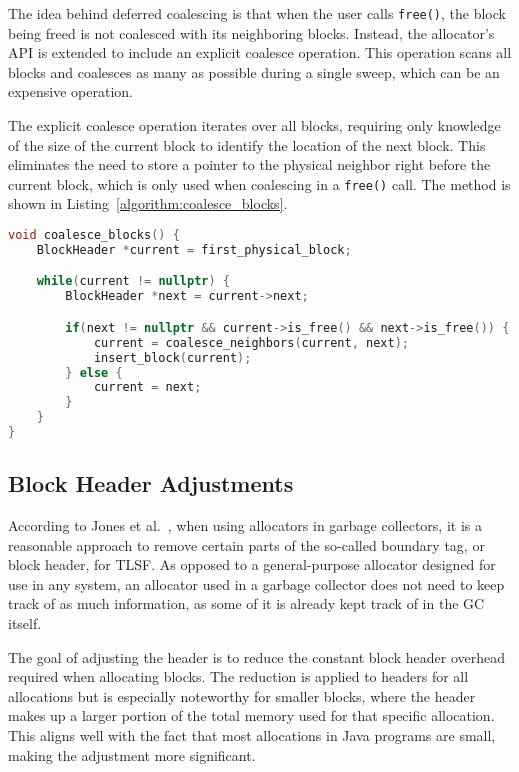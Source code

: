 The idea behind deferred coalescing is that when the user calls \texttt{free()}, the block being freed is not coalesced with its neighboring blocks. Instead, the allocator's API is extended to include an explicit coalesce operation. This operation scans all blocks and coalesces as many as possible during a single sweep, which can be an expensive operation.

The explicit coalesce operation iterates over all blocks, requiring only knowledge of the size of the current block to identify the location of the next block. This eliminates the need to store a pointer to the physical neighbor right before the current block, which is only used when coalescing in a \texttt{free()} call. The method is shown in Listing~\ref{algorithm:coalesce_blocks}.

\begin{lstlisting}[language=C++, caption={Method for explicitly coalescing all possible free blocks in the allocator. Note that coalesce\_neighbors() removes both blocks from the free-list before the newly coalesced block is inserted.}, label={algorithm:coalesce_blocks}]
void coalesce_blocks() {
    BlockHeader *current = first_physical_block;

    while(current != nullptr) {
        BlockHeader *next = current->next;

        if(next != nullptr && current->is_free() && next->is_free()) {
            current = coalesce_neighbors(current, next);
            insert_block(current);
        } else {
            current = next;
        }
    }
}
\end{lstlisting}

\subsection{Block Header Adjustments}
\label{sec:adaptations:block-header-adjustments}

According to Jones et al.~\cite{gchandbook}, when using allocators in garbage collectors, it is a reasonable approach to remove certain parts of the so-called boundary tag, or block header, for TLSF. As opposed to a general-purpose allocator designed for use in any system, an allocator used in a garbage collector does not need to keep track of as much information, as some of it is already kept track of in the GC itself.

The goal of adjusting the header is to reduce the constant block header overhead required when allocating blocks. The reduction is applied to headers for all allocations but is especially noteworthy for smaller blocks, where the header makes up a larger portion of the total memory used for that specific allocation. This aligns well with the fact that most allocations in Java programs are small, making the adjustment more significant.

